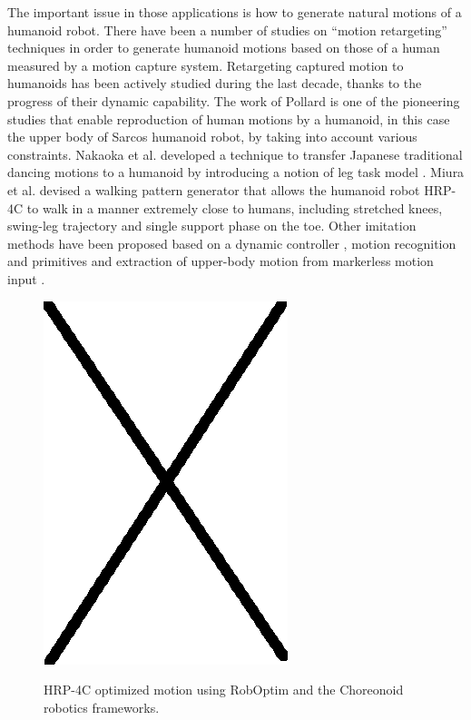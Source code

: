 \documentclass[letterpaper, 10 pt, conference]{ieeeconf}  %
\begin{document}
The important issue in those applications is how to generate natural
motions of a humanoid robot.  There have been a number of studies on
``motion retargeting'' techniques in order to generate humanoid
motions based on those of a human measured by a motion capture system.
Retargeting captured motion to humanoids has been actively studied
during the last decade, thanks to the progress of their dynamic
capability. The work of Pollard \cite{Pollard02ICRA} is one of the
pioneering studies that enable reproduction of human motions by a
humanoid, in this case the upper body of Sarcos humanoid robot, by
taking into account various constraints.  Nakaoka et al. developed a
technique to transfer Japanese traditional dancing motions to a
humanoid by introducing a notion of leg task model
\cite{nakaoka_icra2004,nakaoka_2007}.  Miura et al. \cite{Miura11IROS}
devised a walking pattern generator that allows the humanoid robot
HRP-4C to walk in a manner extremely close to humans, including
stretched knees, swing-leg trajectory and single support phase on the
toe.  Other imitation methods have been proposed based on a dynamic
controller \cite{Yamane11humanoids,Ramos11humanoids}, motion
recognition and primitives \cite{Ott08humanoids} and extraction of
upper-body motion from markerless motion input
\cite{Dariush08IROS,Do08humanoids}.


\begin{figure}
\begin{center}
  \includegraphics[width=0.6 \linewidth]{figure/fixme.png}
  \label{fig:choreonoid-result}
  \caption{HRP-4C optimized motion using RobOptim and the Choreonoid robotics frameworks.}
\end{center}
\end{figure}
\end{document}
